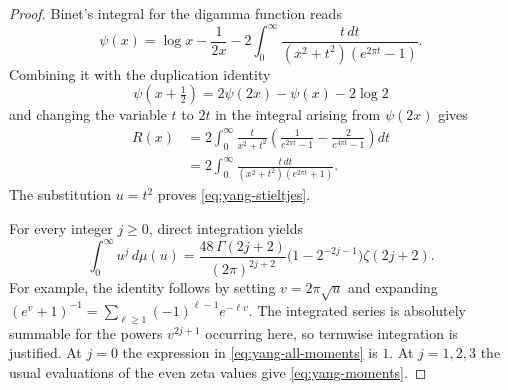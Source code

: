 \documentclass[11pt,a4paper]{article}
\theoremstyle{definition}
\theoremstyle{remark}
\numberwithin{equation}{section}
\begin{document}
\begin{proof}
Binet's integral for the digamma function reads
\[
 \psi(x)=\log x-\frac1{2x}
 -2\int_0^\infty
       \frac{t\,dt}{(x^2+t^2)(e^{2\pi t}-1)}.
\]
Combining it with the duplication identity
\[
 \psi\!\left(x+\tfrac12\right)
       =2\psi(2x)-\psi(x)-2\log2
\]
and changing the variable $t$ to $2t$ in the integral arising from
$\psi(2x)$ gives
\begin{align*}
 R(x)
 &=2\int_0^\infty\frac{t}{x^2+t^2}
       \left(\frac1{e^{2\pi t}-1}
                    -\frac2{e^{4\pi t}-1}\right)dt\\
 &=2\int_0^\infty
       \frac{t\,dt}{(x^2+t^2)(e^{2\pi t}+1)}.
\end{align*}
The substitution $u=t^2$ proves \eqref{eq:yang-stieltjes}.

For every integer $j\ge0$, direct integration yields
\begin{equation}\label{eq:yang-all-moments}
 \int_0^\infty u^j\,d\mu(u)
 =\frac{48\,\Gamma(2j+2)}{(2\pi)^{2j+2}}
       \bigl(1-2^{-2j-1}\bigr)\zeta(2j+2).
\end{equation}
For example, the identity follows by setting $v=2\pi\sqrt u$ and
expanding $(e^v+1)^{-1}=\sum_{\ell\ge1}(-1)^{\ell-1}e^{-\ell v}$.
The integrated series is absolutely summable for the powers
$v^{2j+1}$ occurring here, so termwise integration is justified.
At $j=0$ the expression in \eqref{eq:yang-all-moments} is $1$.
At $j=1,2,3$ the usual evaluations of the even zeta values give
\eqref{eq:yang-moments}.
\end{proof}
\end{document}
